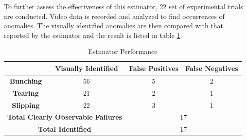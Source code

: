 \documentclass[letterpaper, 10 pt, conference]{ieeeconf}  %
\begin{document}
To further assess the effectiveness of this estimator, 22 set of experimental trials are conducted. Video data is recorded and analyzed to find occurrences of anomalies. The visually identified anomalies are then compared with that reported by the estimator and the result is listed in table \ref{tab:3}. 

\begin{table}[h]
\caption{Estimator Performance}
\label{tab:3}
\begin{tabular}{|c|c|c|c|}
\hline
 & \textbf{Visually Identified} & \textbf{False Positives} & \textbf{False Negatives} \\ \hline
\textbf{Bunching} & 56 & 5 & 2 \\ \hline
\textbf{Tearing} & 21 & 2 & 1 \\ \hline
\textbf{Slipping} & 22 & 3 & 1 \\ \hline
\multicolumn{2}{|c|}{\textbf{Total Clearly Observable Failures}} & \multicolumn{2}{c|}{17} \\ \hline
\multicolumn{2}{|c|}{\textbf{Total Identified}} & \multicolumn{2}{c|}{17} \\ \hline
\end{tabular}
\end{table}
\end{document}
